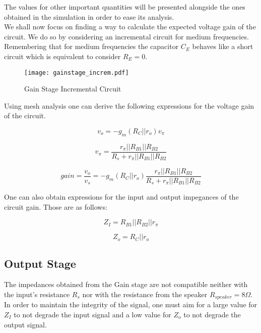The values for other important quantities will be presented alongside the ones obtained in the simulation in order to ease its analysis.\\

We shall now focus on finding a way to calculate the expected voltage gain of the circuit. We do so by considering an incremental circuit for medium frequencies. Remembering that for medium frequencies the capacitor $C_E$ behaves like a short circuit which is equivalent to consider $R_E=0$.

\begin{figure}[H]
\centering
\texttt{[image: gainstage\_increm.pdf]}
\caption{Gain Stage Incremental Circuit}
\label{fig:gain_stage_incremental_circuit}
\end{figure}

Using mesh analysis one can derive the following expressions for the voltage gain of the circuit.

\begin{equation}
v_o=-g_m(R_C||r_o)v_{\pi}
\end{equation}

\begin{equation}
v_{\pi}=\frac{r_{\pi}||R_{B1}||R_{B2}}{R_s+r_{\pi}||R_{B1}||R_{B2}}
\end{equation}

\begin{equation}
gain=\frac{v_o}{v_s}=-g_m(R_C||r_o)\frac{r_{\pi}||R_{B1}||R_{B2}}{R_s+r_{\pi}||R_{B1}||R_{B2}}
\end{equation}

One can also obtain expressions for the input and output impegances of the circuit gain. Those are as follows:


\begin{equation}
Z_I=R_{B1}||R_{B2}||r_{\pi}
\end{equation}

\begin{equation}
Z_o=R_C||r_o
\end{equation}

\subsection{Output Stage}
The impedances obtained from the Gain stage are not compatible neither with the input's resistance $R_s$ nor with the resistance from the speaker $R_{speaker}=8\Omega$. In order to maintain the integrity of the signal, one must aim for a large value for $Z_I$ to not degrade the input signal and a low value for $Z_o$ to not degrade the output signal.\\

